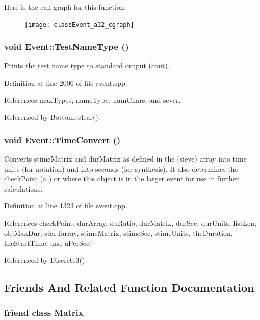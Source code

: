 Here is the call graph for this function:\begin{figure}[H]
\begin{center}
\leavevmode
\texttt{[image: classEvent\_a32\_cgraph]}
\end{center}
\end{figure}
\subsubsection{\setlength{\rightskip}{0pt plus 5cm}void Event::Test\-Name\-Type ()}\label{classEvent_a49}


Prints the test name type to standard output (cout). 

Definition at line 2006 of file event.cpp.

References max\-Types, name\-Type, num\-Chars, and sever.

Referenced by Bottom::clear().
\subsubsection{\setlength{\rightskip}{0pt plus 5cm}void Event::Time\-Convert ()}\label{classEvent_a44}


Converts stime\-Matrix and dur\-Matrix as defined in the (sieve) array into time units (for notation) and into seconds (for synthesis). It also determines the check\-Point (a ) or where this object is in the larger event for use in further calculations. 

Definition at line 1323 of file event.cpp.

References check\-Point, dur\-Array, du\-Ratio, dur\-Matrix, dur\-Sec, dur\-Units, list\-Len, obj\-Max\-Dur, star\-Tarray, stime\-Matrix, stime\-Sec, stime\-Units, the\-Duration, the\-Start\-Time, and u\-Per\-Sec.

Referenced by Discrete3().

\subsection{Friends And Related Function Documentation}
\subsubsection{\setlength{\rightskip}{0pt plus 5cm}friend class {\bf Matrix}\hspace{0.3cm}{\tt  [friend]}}\label{classEvent_n0}




